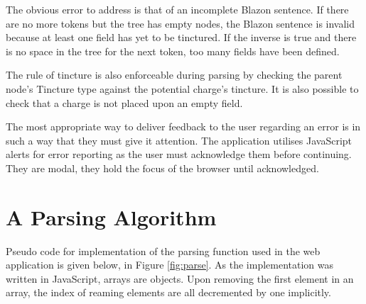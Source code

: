 The obvious error to address is that of an incomplete Blazon sentence.  If there are no more tokens but the tree has empty nodes, the Blazon sentence is invalid because at least one field has yet to be tinctured.  If the inverse is true and there is no space in the tree for the next token, too many fields have been defined.

The rule of tincture is also enforceable during parsing by checking the parent node's Tincture type against the potential charge's tincture.   It is also possible to check that a charge is not placed upon an empty field. 

The most appropriate way to deliver feedback to the user regarding an error is in such a way that they must give it attention.  The application utilises JavaScript alerts for error reporting as the user must acknowledge them before continuing. They are modal, they hold the focus of the browser until acknowledged. 


\section{A Parsing Algorithm}

Pseudo code for implementation of the parsing function used in the web application is given below, in Figure \ref{fig:parse}.  As the implementation was written in JavaScript, arrays are objects.  Upon removing the first element in an array, the index of reaming elements are all decremented by one implicitly. 

